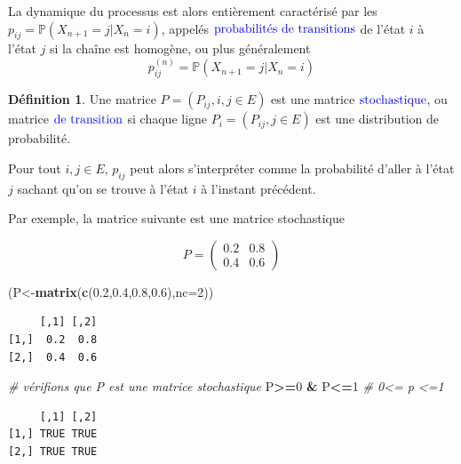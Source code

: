 \documentclass[
]{book}
\newenvironment{Shaded}{\begin{snugshade}}{\end{snugshade}}
\newcommand{\CommentTok}[1]{\textcolor[rgb]{0.56,0.35,0.01}{\textit{#1}}}
\newcommand{\DataTypeTok}[1]{\textcolor[rgb]{0.13,0.29,0.53}{#1}}
\newcommand{\DecValTok}[1]{\textcolor[rgb]{0.00,0.00,0.81}{#1}}
\newcommand{\FloatTok}[1]{\textcolor[rgb]{0.00,0.00,0.81}{#1}}
\newcommand{\KeywordTok}[1]{\textcolor[rgb]{0.13,0.29,0.53}{\textbf{#1}}}
\newcommand{\NormalTok}[1]{#1}
\newcommand{\OperatorTok}[1]{\textcolor[rgb]{0.81,0.36,0.00}{\textbf{#1}}}
\newcommand{\StringTok}[1]{\textcolor[rgb]{0.31,0.60,0.02}{#1}}
\theoremstyle{definition}
\newtheorem{definition}{Définition}[chapter]
\theoremstyle{definition}
\theoremstyle{definition}
\theoremstyle{remark}
\begin{document}
La dynamique du processus est alors entièrement caractérisé par les \(p_{ij}=\mathbb{P}(X_{n+1}=j|X_n=i)\), appelés \(\color{blue}{\mathbf{\text{probabilités de transitions}}}\) de l'état \(i\) à l'état \(j\) si la chaîne est homogène, ou plus généralement
\[ p_{ij}^{(n)}=\mathbb{P}(X_{n+1}=j|X_n=i)\]
\begin{definition}
\protect\hypertarget{def:unnamed-chunk-38}{}{\label{def:unnamed-chunk-38} }Une matrice \(P=(P_{ij},i,j \in E)\) est une matrice \(\color{blue}{\mathbf{\text{stochastique}}}\), ou matrice \(\color{blue}{\mathbf{\text{de transition}}}\) si chaque ligne \(P_i=(P_{ij}, j \in E)\) est une distribution de probabilité.
\end{definition}

Pour tout \(i,j \in E\), \(p_{ij}\) peut alors s'interpréter comme la probabilité d'aller à l'état \(j\) sachant qu'on se trouve à l'état \(i\) à l'instant précédent.

Par exemple, la matrice suivante est une matrice stochastique

\[
P=\left( 
\begin{array}{cc}
0.2 & 0.8\\
0.4 & 0.6
\end{array}
\right)
\]

\begin{Shaded}
\begin{Highlighting}[]
\NormalTok{(P<-}\KeywordTok{matrix}\NormalTok{(}\KeywordTok{c}\NormalTok{(}\FloatTok{0.2}\NormalTok{,}\FloatTok{0.4}\NormalTok{,}\FloatTok{0.8}\NormalTok{,}\FloatTok{0.6}\NormalTok{),}\DataTypeTok{nc=}\DecValTok{2}\NormalTok{))}
\end{Highlighting}
\end{Shaded}

\begin{verbatim}
     [,1] [,2]
[1,]  0.2  0.8
[2,]  0.4  0.6
\end{verbatim}

\begin{Shaded}
\begin{Highlighting}[]
\CommentTok{# vérifions que P est une matrice stochastique}
\NormalTok{P}\OperatorTok{>=}\DecValTok{0} \OperatorTok{&}\StringTok{ }\NormalTok{P}\OperatorTok{<=}\DecValTok{1}  \CommentTok{# 0<= p <=1}
\end{Highlighting}
\end{Shaded}

\begin{verbatim}
     [,1] [,2]
[1,] TRUE TRUE
[2,] TRUE TRUE
\end{verbatim}
\end{document}
